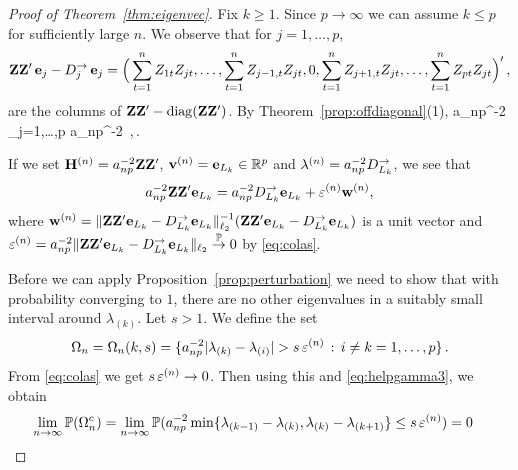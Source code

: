 \begin{proof}[Proof of Theorem~\ref{thm:eigenvec}]
Fix $k\ge 1$. Since $p\to \infty$ we can assume $k\le p$ for sufficiently large $n$.
We observe that for $j=1,\ldots,p$,
\begin{equation*}
{\mathbf Z}{\mathbf Z}' \,{\mathbf e}_j -D^{\rightarrow}_j \,{\mathbf e}_j = \Big( \sum_{t=1}^n Z_{1t}Z_{jt}, \ldots,\sum_{t=1}^n Z_{j-1,t}Z_{jt}, 0,  \sum_{t=1}^n Z_{j+1,t}Z_{jt}, \ldots,\sum_{t=1}^n Z_{pt}Z_{jt} \Big)'\,,
\end{equation*}
are the columns of ${\mathbf Z}{\mathbf Z}' -\operatorname{diag}({\mathbf Z}{\mathbf Z}')$. By Theorem~\ref{prop:offdiagonal}(1),
\beam \label{eq:colas}
a_{np}^{-2} \max_{j=1,\ldots,p} 
 \le a_{np}^{-2}  \,,\,\nto.
\eeam

If we set ${\mathbf H}^{(n)}=a_{np}^{-2}{\mathbf Z}{\mathbf Z}'$, ${\mathbf v}^{(n)}={\mathbf e}_{L_k} \in \mathbb{R}^p$ and $\lambda^{(n)}= a_{np}^{-2} D^{\rightarrow}_{L_k}$, we see that
\begin{equation*}
a_{np}^{-2}{\mathbf Z}{\mathbf Z}' {\mathbf e}_{L_k} = a_{np}^{-2} D^{\rightarrow}_{L_k} {\mathbf e}_{L_k} + \varepsilon^{(n)} {\mathbf w}^{(n)},
\end{equation*}
 where ${\mathbf w}^{(n)}= \|{\mathbf Z}{\mathbf Z}' {\mathbf e}_{L_k} -D^{\rightarrow}_{L_k} {\mathbf e}_{L_k}\|_{\ell_2}^{-1} ({\mathbf Z}{\mathbf Z}' {\mathbf e}_{L_k} -D^{\rightarrow}_{L_k} {\mathbf e}_{L_k})$ is a unit vector and $\varepsilon^{(n)}= a_{np}^{-2} \|{\mathbf Z}{\mathbf Z}' {\mathbf e}_{L_k} -D^{\rightarrow}_{L_k} {\mathbf e}_{L_k}\|_{\ell_2} \stackrel{\mathbb{P}}{\rightarrow} 0$ by \eqref{eq:colas}. 

Before we can apply Proposition~\ref{prop:perturbation} we need to show that with probability converging to $1$, there are no other eigenvalues in a suitably small interval around $\lambda_{(k)}$. Let $s>1$. We define the set
\begin{equation*}
\Omega_n = \Omega_n(k,s)= \{a_{np}^{-2} |\la_{(k)}-\la_{(i)}|>s\, \vep^{(n)}\, :\, i\neq k =1,\ldots,p  \}\,.
\end{equation*} 
From \eqref{eq:colas} we get $s\, \varepsilon^{(n)}\to 0$. Then using this and \eqref{eq:helpgamma3}, we obtain
\begin{equation*}
\begin{split}
\lim_{n \to \infty} \mathbb{P}(\Omega_n^c) &= \lim_{n \to \infty} \mathbb{P}( a_{np}^{-2} \min\{ \lambda_{(k-1)}-\lambda_{(k)}, \lambda_{(k)}-\lambda_{(k+1)}\} \le s\, \varepsilon^{(n)}) =0
\end{split}
\end{equation*}


\end{proof}
